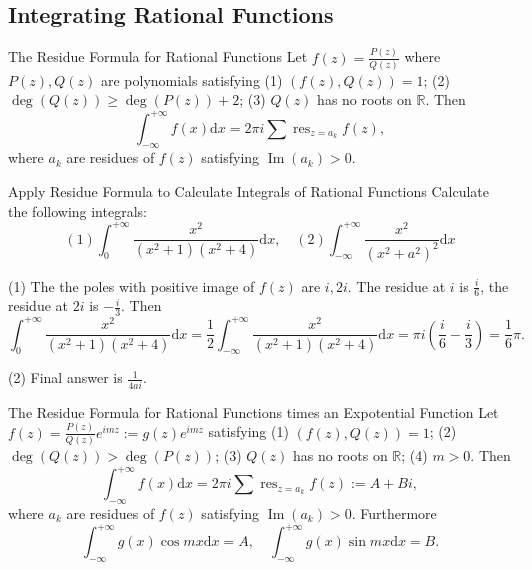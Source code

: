 \subsection{Integrating Rational Functions}

\begin{proposition}{The Residue Formula for Rational Functions}{}
  Let $f(z) = \frac{P(z)}{Q(z)}$ where $P(z), Q(z)$ are polynomials satisfying
  (1) $(f(z), Q(z)) = 1$;
  (2) $\operatorname{deg}(Q(z)) \geq \operatorname{deg}(P(z)) + 2$;
  (3) $Q(z)$ has no roots on $\mathbb{R}$.
  Then 
  \begin{equation}
    \int_{-\infty}^{+\infty} f(x) \mathrm{d} x
    = 2\pi i \sum \operatorname{res}_{z = a_k}f(z),
  \end{equation}
  where $a_k$ are residues of $f(z)$ satisfying $\operatorname{Im}(a_k) > 0$.
\end{proposition}

\begin{example}{Apply Residue Formula to Calculate Integrals of Rational Functions}{}
  Calculate the following integrals:
  \begin{equation}
    (1) \int_0^{+\infty} \frac{x^2}{(x^2 + 1)(x^2 + 4)}\mathrm{d} x, \quad
    (2) \int_{-\infty}^{+\infty} \frac{x^2}{(x^2 + a^2)^2}\mathrm{d} x
  \end{equation}
\end{example}

\begin{solution}
  (1) The the poles with positive image of $f(z)$ are $i, 2i$.
  The residue at $i$ is $\frac{i}{6}$, the residue at $2i$ is $- \frac{i}{3}$. Then
  \begin{equation}
    \int_0^{+\infty} \frac{x^2}{(x^2 + 1)(x^2 + 4)}\mathrm{d} x
    = \frac{1}{2} \int_{-\infty}^{+\infty} \frac{x^2}{(x^2 + 1)(x^2 + 4)}\mathrm{d} x
    = \pi i (\frac{i}{6} - \frac{i}{3}) = \frac{1}{6}\pi.
  \end{equation}

  (2) Final answer is $\frac{1}{4a i}$.
\end{solution}

\begin{proposition}{The Residue Formula for Rational Functions times an Expotential Function}{}
  Let $f(z) = \frac{P(z)}{Q(z)} e^{imz} := g(z) e^{imz}$ satisfying
  (1) $(f(z), Q(z)) = 1$;
  (2) $\operatorname{deg}(Q(z)) > \operatorname{deg}(P(z))$;
  (3) $Q(z)$ has no roots on $\mathbb{R}$;
  (4) $m > 0$.
  Then
  \begin{equation}
    \int_{-\infty}^{+\infty} f(x)\mathrm{d} x = 2 \pi i \sum \operatorname{res}_{z = a_k} f(z) := A + Bi,
  \end{equation}
  where $a_k$ are residues of $f(z)$ satisfying $\operatorname{Im}(a_k) > 0$.
  Furthermore
  \begin{equation}
    \int_{-\infty}^{+\infty} g(x) \cos mx \mathrm{d} x = A, \quad
    \int_{-\infty}^{+\infty} g(x) \sin mx \mathrm{d} x = B.
  \end{equation}
\end{proposition}

